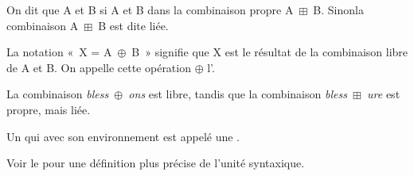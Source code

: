 {On dit que A et B  si A et B  dans la combinaison propre A~${\boxplus}$~B. Sinonla combinaison A~${\boxplus}$~B est dite liée.}

{La notation «~X = A~${\oplus}$~B~» signifie que X est le résultat de la combinaison libre de A et B. On appelle cette opération ${\oplus}$ l’.}

La combinaison \textit{bless~}${\oplus}$\textit{~ons} est libre, tandis que la combinaison \textit{bless~}${\boxplus}$\textit{~ure} est propre, mais {liée}.

{Un  qui  avec son environnement est appelé une .}

Voir le  pour une définition plus précise de l'unité syntaxique.%

